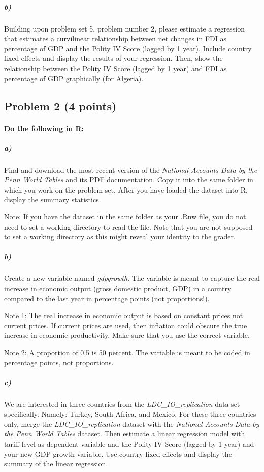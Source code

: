 \documentclass[12pt]{article}
\begin{document}
\subparagraph{b)} Building upon problem set 5, problem number 2, please estimate a regression that estimates a curvilinear relationship between net changes in FDI as percentage of GDP and the Polity IV Score (lagged by 1 year). Include country fixed effects and display the results of your regression. Then, show the relationship between the Polity IV Score (lagged by 1 year) and FDI as percentage of GDP graphically (for Algeria).



\subsection*{Problem 2 (4 points)}

\paragraph{Do the following in R:}

\subparagraph{a)} Find and download the most recent version of the \textit{National Accounts Data by the Penn World Tables} and its PDF documentation. Copy it into the same folder in which you work on the problem set. After you have loaded the dataset into R, display the summary statistics.

Note: If you have the dataset in the same folder as your .Rnw file, you do not need to set a working directory to read the file. Note that you are not supposed to set a working directory as this might reveal your identity to the grader.

\subparagraph{b)} Create a new variable named \textit{gdpgrowth}. The variable is meant to capture the real increase in economic output (gross domestic product, GDP) in a country compared to the last year in percentage points (not proportions!).

Note 1: The real increase in economic output is based on constant prices not current prices. If current prices are used, then inflation could obscure the true increase in economic productivity. Make sure that you use the correct variable.

Note 2: A proportion of 0.5 is 50 percent. The variable is meant to be coded in percentage points, not proportions.

\subparagraph{c)} We are interested in three countries from the \textit{LDC\_IO\_replication} data set specifically. Namely: Turkey, South Africa, and Mexico. For these three countries only, merge the \textit{LDC\_IO\_replication} dataset with the \textit{National Accounts Data by the Penn World Tables} dataset. Then estimate a linear regression model with tariff level as dependent variable and the Polity IV Score (lagged by 1 year) and your new GDP growth variable. Use country-fixed effects and display the summary of the linear regression.
\end{document}
